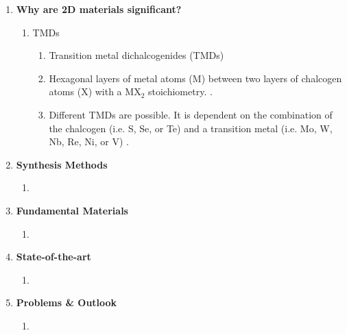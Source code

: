 \documentclass{article}
\begin{document}
\begin{enumerate}
\begin{enumerate}
		\end{enumerate} %
	\item{\textbf{Why are 2D materials significant?}}

		\begin{enumerate} %
			\item{TMDs}
				\begin{enumerate}
					\item{Transition metal dichalcogenides (TMDs)}
					\item{Hexagonal layers of metal atoms ($\mathrm{M}$) between two layers of chalcogen atoms ($\mathrm{X}$) with a $\mathrm{MX}_2$ stoichiometry. \cite{grapheneLike2Dreview2013}.}
					\item{Different TMDs are possible. It is dependent on the combination of the chalcogen (i.e. S, Se, or Te) and a transition metal (i.e. Mo, W, Nb, Re, Ni, or V) \cite{WilsonTMDs1969, grapheneLike2Dreview2013}.}
				\end{enumerate}
		\end{enumerate} %

	\item{\textbf{Synthesis Methods}}
		\begin{enumerate} %
			\item{}
		\end{enumerate} %
	\item{\textbf{Fundamental Materials}} 
		\begin{enumerate}	%
			\item{}
		\end{enumerate} %
	\item{\textbf{State-of-the-art}}
		\begin{enumerate} %
			\item{}
		\end{enumerate}	%
	\item{\textbf{Problems \& Outlook}}
		\begin{enumerate}	%
			\item{}
		\end{enumerate} %
\end{enumerate} %



\end{document}
